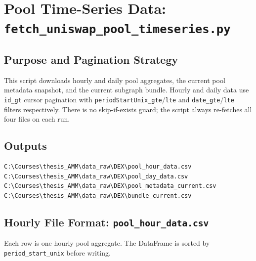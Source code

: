 \documentclass[11pt,a4paper]{article}
\begin{document}
\section{Pool Time-Series Data: \texttt{fetch\_uniswap\_pool\_timeseries.py}}
\label{sec:timeseries}

\subsection{Purpose and Pagination Strategy}

This script downloads hourly and daily pool aggregates, the current pool
metadata snapshot, and the current subgraph bundle. Hourly and daily data
use \texttt{id\_gt} cursor pagination with
\texttt{periodStartUnix\_gte}/\texttt{lte} and \texttt{date\_gte}/\texttt{lte}
filters respectively. There is no skip-if-exists guard; the script always
re-fetches all four files on each run.

\subsection{Outputs}

\begin{lstlisting}
C:\Courses\thesis_AMM\data_raw\DEX\pool_hour_data.csv
C:\Courses\thesis_AMM\data_raw\DEX\pool_day_data.csv
C:\Courses\thesis_AMM\data_raw\DEX\pool_metadata_current.csv
C:\Courses\thesis_AMM\data_raw\DEX\bundle_current.csv
\end{lstlisting}

\subsection{Hourly File Format: \texttt{pool\_hour\_data.csv}}

Each row is one hourly pool aggregate. The DataFrame is sorted by
\texttt{period\_start\_unix} before writing.
\end{document}
